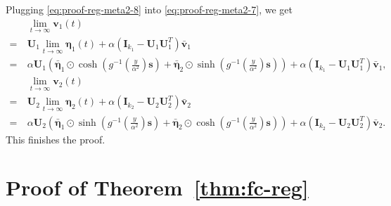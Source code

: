 \documentclass{article} %
\def\vs{{\bm{s}}}
\def\vv{{\bm{v}}}
\def\mI{{\bm{I}}}
\def\mU{{\bm{U}}}
\newcommand{\veta}{{\bm{\eta}}}
\begin{document}
Plugging \eqref{eq:proof-reg-meta2-8} into \eqref{eq:proof-reg-meta2-7}, we get
\begin{align*}
    &~\lim_{t\to\infty} \vv_1(t) \\
    =&~ \mU_1 \lim_{t \to \infty} \veta_1(t) + \alpha (\mI_{k_1} - \mU_1 \mU_1^T ) \bar \vv_1\\
    =&~ \alpha \mU_1 \left ( 
    \bar \veta_1 \odot \cosh \left ( g^{-1} \left( \frac{y}{\alpha^2} \right ) \vs \right) 
    +  \bar \veta_2 \odot \sinh \left ( g^{-1} \left( \frac{y}{\alpha^2} \right ) \vs \right ) 
    \right )
    + \alpha (\mI_{k_1} - \mU_1 \mU_1^T )\bar \vv_1,\\
    &~\lim_{t\to\infty} \vv_2(t) \\
    =&~ \mU_2 \lim_{t \to \infty} \veta_2(t) + \alpha (\mI_{k_2} - \mU_2 \mU_2^T ) \bar \vv_2\\
    =&~ \alpha \mU_2 \left ( 
    \bar \veta_1 \odot \sinh \left ( g^{-1} \left( \frac{y}{\alpha^2} \right ) \vs \right) 
    +  \bar \veta_2 \odot \cosh \left ( g^{-1} \left( \frac{y}{\alpha^2} \right ) \vs \right ) 
    \right )
    + \alpha (\mI_{k_2} - \mU_2 \mU_2^T )\bar \vv_2.
\end{align*}
This finishes the proof.

\section{Proof of Theorem~\ref{thm:fc-reg}}
\label{sec:proof-thm-fc-reg}
\end{document}
